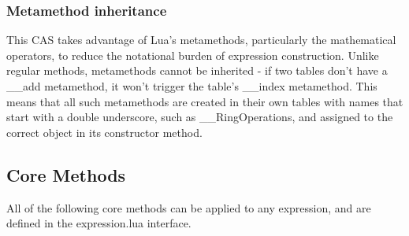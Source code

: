 \documentclass{article}
\begin{document}
\subsubsection{Metamethod inheritance}
This CAS takes advantage of Lua's metamethods, particularly the mathematical operators, to reduce the notational burden of expression construction. Unlike regular methods, metamethods cannot be inherited - if two tables don't have a {\ttfamily \_\_add} metamethod, it won't trigger the table's {\ttfamily \_\_index} metamethod. This means that all such metamethods are created in their own tables with names that start with a double underscore, such as {\ttfamily \_\_RingOperations}, and assigned to the correct object in its constructor method.


\subsection{Core Methods}

All of the following core methods can be applied to any expression, and are defined in the {\ttfamily expression.lua} interface.
\end{document}
